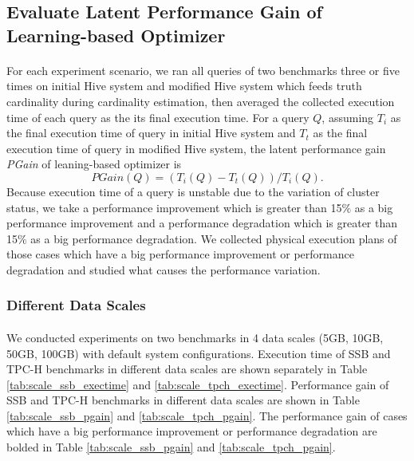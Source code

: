     \subsection{Evaluate Latent Performance Gain of Learning-based Optimizer}
        \paragraph{}
        For each experiment scenario, we ran all queries of two benchmarks three or five times on initial Hive system and modified Hive system which feeds truth 
        cardinality during cardinality estimation, then averaged the collected execution time of each query as the its final execution time. For a 
        query $Q$, assuming $T_i$ as the final execution time of query in initial Hive system and $T_t$ as the final execution time of query in modified Hive 
        system, the latent performance gain \textit{PGain} of leaning-based optimizer is $$PGain(Q) = (T_i(Q) - T_t(Q)) / T_i(Q).$$ Because execution time of a query 
        is unstable due to the variation of cluster status, we take a performance improvement which is greater than 15$\%$ as a big performance improvement and a 
        performance degradation which is greater than 15$\%$ as a big performance degradation. We collected physical execution plans of those cases which have a big 
        performance improvement or performance degradation and studied what causes the performance variation.        
        \subsubsection{Different Data Scales}
            \paragraph{}
            We conducted experiments on two benchmarks in 4 data scales (5GB, 10GB, 50GB, 100GB) with default system configurations. Execution time of SSB 
            and TPC-H benchmarks in different data scales are shown separately in Table \ref{tab:scale_ssb_exectime} and \ref{tab:scale_tpch_exectime}. Performance 
            gain of SSB and TPC-H benchmarks in different data scales are shown in Table \ref{tab:scale_ssb_pgain} and \ref{tab:scale_tpch_pgain}. The performance 
            gain of cases which have a big performance improvement or performance degradation are bolded in Table \ref{tab:scale_ssb_pgain} and \ref{tab:scale_tpch_pgain}. 
